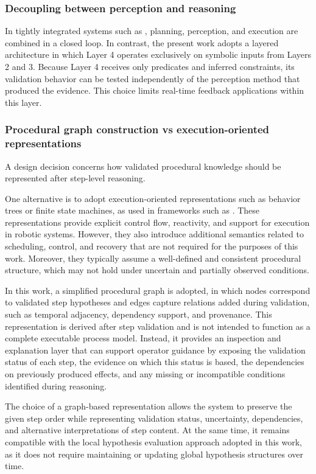 \subsubsection{Decoupling between perception and reasoning}
In tightly integrated systems such as \citep{Zhao2025VideoToBT}, planning, perception, and execution are combined in a closed loop. In contrast, the present work adopts a layered architecture in which Layer 4 operates exclusively on symbolic inputs from Layers 2 and 3. Because Layer 4 receives only predicates and inferred constraints, its validation behavior can be tested independently of the perception method that produced the evidence. This choice limits real-time feedback applications within this layer.

\subsubsection{Procedural graph construction vs execution-oriented representations}

A design decision concerns how validated procedural knowledge should be represented after step-level reasoning.

One alternative is to adopt execution-oriented representations such as behavior trees or finite state machines, as used in frameworks such as \citep{Zhao2025VideoToBT}. These representations provide explicit control flow, reactivity, and support for execution in robotic systems. However, they also introduce additional semantics related to scheduling, control, and recovery that are not required for the purposes of this work. Moreover, they typically assume a well-defined and consistent procedural structure, which may not hold under uncertain and partially observed conditions.

In this work, a simplified procedural graph is adopted, in which nodes correspond to validated step hypotheses and edges capture relations added during validation, such as temporal adjacency, dependency support, and provenance. This representation is derived after step validation and is not intended to function as a complete executable process model. Instead, it provides an inspection and explanation layer that can support operator guidance by exposing the validation status of each step, the evidence on which this status is based, the dependencies on previously produced effects, and any missing or incompatible conditions identified during reasoning.

The choice of a graph-based representation allows the system to preserve the given step order while representing validation status, uncertainty, dependencies, and alternative interpretations of step content. At the same time, it remains compatible with the local hypothesis evaluation approach adopted in this work, as it does not require maintaining or updating global hypothesis structures over time.

